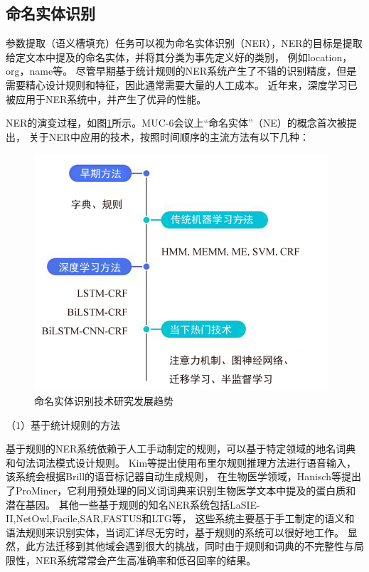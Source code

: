 \subsection{命名实体识别}
参数提取（语义槽填充）任务可以视为命名实体识别（NER），NER的目标是提取给定文本中提及的命名实体，并将其分类为事先定义好的类别，
例如location，org，name等。
尽管早期基于统计规则的NER系统产生了不错的识别精度，但是需要精心设计规则和特征，因此通常需要大量的人工成本。
近年来，深度学习已被应用于NER系统中，并产生了优异的性能。

NER的演变过程，如图\ref{fig:nerp}所示。MUC-6会议上“命名实体”（NE）的概念首次被提出，
关于NER中应用的技术，按照时间顺序的主流方法有以下几种：

\begin{figure}[htbp]
  \centering
  \includegraphics[scale=1]{./images/nerp.jpg}
  \caption{命名实体识别技术研究发展趋势\cite{nadeau2007survey}}
  \label{fig:nerp}
\end{figure}

（1）基于统计规则的方法

基于规则的NER系统依赖于人工手动制定的规则，可以基于特定领域的地名词典和句法词法模式设计规则。
Kim等提出使用布里尔规则推理方法进行语音输入，该系统会根据Brill的语音标记器自动生成规则\cite{kim2000rule}，
在生物医学领域，Hanisch等提出了ProMiner，它利用预处理的同义词词典来识别生物医学文本中提及的蛋白质和潜在基因\cite{hanisch2005prominer}。 
其他一些基于规则的知名NER系统包括LaSIE-II,NetOwl,Facile,SAR,FASTUS和LTG等\cite{pomares2016named}，
这些系统主要基于手工制定的语义和语法规则来识别实体，当词汇详尽无穷时，基于规则的系统可以很好地工作。
显然，此方法迁移到其他域会遇到很大的挑战，同时由于规则和词典的不完整性与局限性，NER系统常常会产生高准确率和低召回率的结果。

